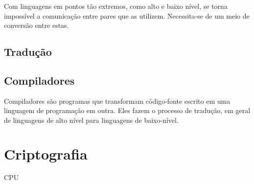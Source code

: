 Com linguagens em pontos tão extremos, como alto e baixo nível, se torna
impossível a comunicação entre pares que as utilizem. Necessita-se de um meio
de conversão entre estas.

\subsection{Tradução}




\subsection{Compiladores}

Compiladores são programas que transformam código-fonte escrito em uma linguagem
de programação em outra. Eles fazem o processo de tradução, em geral de
linguagens de alto nível para linguagens de baixo-nível.

\section{Criptografia}

CPU

